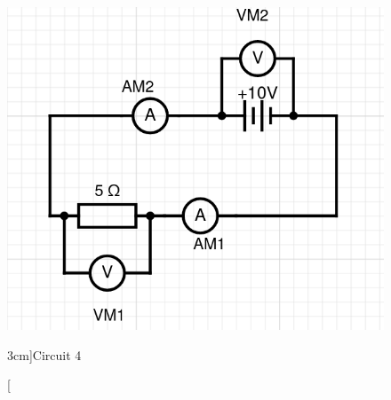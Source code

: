 \documentclass[a4paper,openany,nobib]{tufte-book}
\begin{document}
\begin{figure}[h!]
	\center
	\includegraphics[width=\linewidth]{Vary}
	\caption[][3cm]{Circuit 4}
\end{figure}
\end{document}
